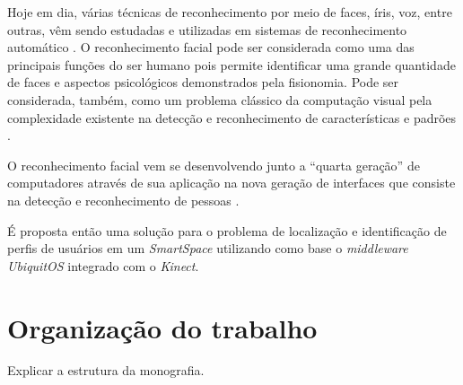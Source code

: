 Hoje em dia, várias técnicas de reconhecimento por meio de faces, íris, voz, entre outras, vêm sendo estudadas e utilizadas em sistemas de reconhecimento automático \cite{bolle}. O reconhecimento facial pode ser considerada como uma das principais funções do ser humano pois permite identificar uma grande quantidade de faces e aspectos psicológicos demonstrados pela fisionomia. Pode ser considerada, também, como um problema clássico da computação visual pela complexidade existente na detecção e reconhecimento de características e padrões \cite{saocarlos}.

O reconhecimento facial vem se desenvolvendo junto a ``quarta geração'' de computadores através de sua aplicação na nova geração de interfaces que consiste na detecção e reconhecimento de pessoas \cite{saocarlos}. 

É proposta então uma solução para o problema de localização e identificação de perfis de usuários em um \textit{SmartSpace} utilizando como base o \textit{middleware} \textit{UbiquitOS} \cite{alegomes} integrado com o \textit{Kinect}.

\section{Organização do trabalho}

	Explicar a estrutura da monografia.